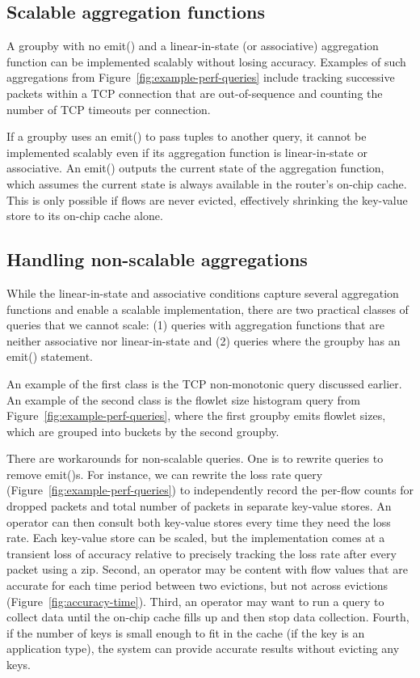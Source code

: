 \subsection{Scalable aggregation functions}
\label{sec:scalable}
A {\ct groupby} with no {\ct emit()} and a linear-in-state (or associative)
aggregation function can be implemented scalably without losing accuracy.
Examples of such aggregations from Figure~\ref{fig:example-perf-queries}
include tracking successive packets within a TCP connection that are
out-of-sequence and counting the number of TCP timeouts per connection.

 If a {\ct groupby} uses an {\ct emit()} to pass tuples to another query, it
cannot be implemented scalably even if its aggregation function is
linear-in-state or associative. An {\ct emit()} outputs the current state of
the aggregation function, which assumes the current state is always available
in the router's on-chip cache. This is only possible if flows are never
evicted, effectively shrinking the key-value store to its on-chip cache alone.

\subsection{Handling non-scalable aggregations}
\label{sec:workaround-nonscalable}
While the linear-in-state and associative conditions capture several
aggregation functions and enable a scalable implementation, there are two
practical classes of queries that we cannot scale: (1) queries with aggregation
functions that are neither associative nor linear-in-state and (2) queries
where the groupby has an {\ct emit()} statement.

An example of the first class is the TCP non-monotonic query discussed earlier.
An example of the second class is the flowlet size histogram query from
Figure~\ref{fig:example-perf-queries}, where the first {\ct groupby} emits
flowlet sizes, which are grouped into buckets by the second {\ct groupby}.

There are workarounds for non-scalable queries. One is to rewrite queries to
remove {\ct emit()}s.  For instance, we can rewrite the loss rate query
(Figure~\ref{fig:example-perf-queries}) to independently record the per-flow
counts for dropped packets and total number of packets in separate key-value
stores. An operator can then consult both key-value stores every time they need
the loss rate. Each key-value store can be scaled, but the implementation comes
at a transient loss of accuracy relative to precisely tracking the loss rate
after every packet using a {\ct zip.} Second, an operator may be content with
flow values that are accurate for each time period between two evictions, but
not across evictions (Figure~\ref{fig:accuracy-time}). Third, an operator may
want to run a query to collect data until the on-chip cache fills up and then
stop data collection.  Fourth, if the number of keys is small enough to fit in
the cache (\eg if the key is an application type), the system can provide
accurate results without evicting any keys.


